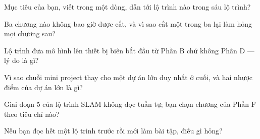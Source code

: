 \documentclass[../../deep_learning.tex]{subfiles}
\begin{document}
\begin{tukiem}
\item Mục tiêu của bạn, viết trong một dòng, dẫn tới lộ trình nào trong sáu lộ trình?
\item Ba chương nào không bao giờ được cắt, và vì sao cắt một trong ba lại làm hỏng mọi chương sau?
\item Lộ trình đưa mô hình lên thiết bị biên bắt đầu từ Phần B chứ không Phần D --- lý do là gì?
\item Vì sao chuỗi mini project thay cho một dự án lớn duy nhất ở cuối, và hai nhược điểm của dự án lớn là gì?
\item Giai đoạn 5 của lộ trình SLAM không đọc tuần tự; bạn chọn chương của Phần F theo tiêu chí nào?
\item Nếu bạn đọc hết một lộ trình trước rồi mới làm bài tập, điều gì hỏng?
\end{tukiem}
\end{document}
